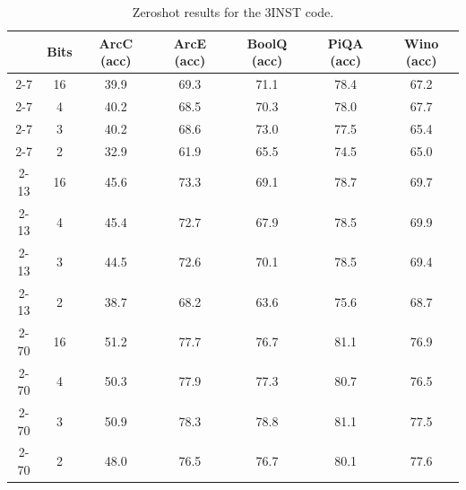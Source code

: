 \begin{table}[h]
\caption{Zeroshot results for the 3INST code.}
\centering
\begin{tabular}{@{}ccccccc@{}}
\toprule
     & Bits & ArcC (acc) & ArcE (acc) & BoolQ (acc) & PiQA (acc) & Wino (acc) \\ \midrule
2-7  & 16   & 39.9       & 69.3       & 71.1        & 78.4       & 67.2       \\
2-7  & 4    & 40.2       & 68.5       & 70.3        & 78.0       & 67.7       \\
2-7  & 3    & 40.2       & 68.6       & 73.0        & 77.5       & 65.4       \\
2-7  & 2    & 32.9       & 61.9       & 65.5        & 74.5       & 65.0       \\
2-13 & 16   & 45.6       & 73.3       & 69.1        & 78.7       & 69.7       \\
2-13 & 4    & 45.4       & 72.7       & 67.9        & 78.5       & 69.9       \\
2-13 & 3    & 44.5       & 72.6       & 70.1        & 78.5       & 69.4       \\
2-13 & 2    & 38.7       & 68.2       & 63.6        & 75.6       & 68.7       \\
2-70 & 16   & 51.2       & 77.7       & 76.7        & 81.1       & 76.9       \\
2-70 & 4    & 50.3       & 77.9       & 77.3        & 80.7       & 76.5       \\
2-70 & 3    & 50.9       & 78.3       & 78.8        & 81.1       & 77.5       \\
2-70 & 2    & 48.0       & 76.5       & 76.7        & 80.1       & 77.6       \\ \bottomrule
\end{tabular}
\end{table}


